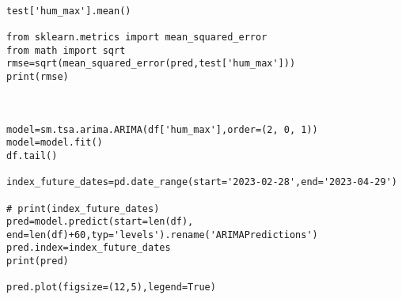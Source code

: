 \begin{lstlisting}
                                                                           
test['hum_max'].mean()

from sklearn.metrics import mean_squared_error
from math import sqrt
rmse=sqrt(mean_squared_error(pred,test['hum_max']))
print(rmse)

                                         

model=sm.tsa.arima.ARIMA(df['hum_max'],order=(2, 0, 1))
model=model.fit()
df.tail()

index_future_dates=pd.date_range(start='2023-02-28',end='2023-04-29')
                                  
# print(index_future_dates)
pred=model.predict(start=len(df),
end=len(df)+60,typ='levels').rename('ARIMAPredictions')
pred.index=index_future_dates
print(pred)

pred.plot(figsize=(12,5),legend=True)


\end{lstlisting}
